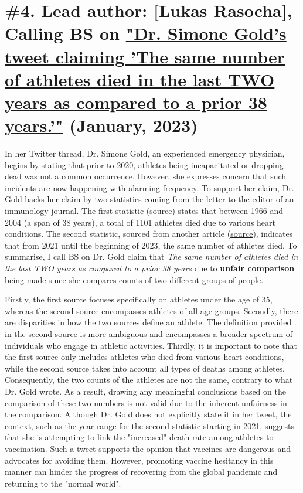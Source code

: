 \documentclass[fleqn,12pt]{article}
\begin{document}
\section{\#4. Lead author: [Lukas Rasocha], Calling BS on \href{https://twitter.com/drsimonegold/status/1610361145294000131?s=20}{"Dr. Simone Gold's tweet claiming 'The same number of athletes died in the last TWO years as 
compared to a prior 38 years.'"} (January, 2023)}
In her Twitter thread, Dr. Simone Gold, an experienced emergency physician, begins by stating that prior to 2020, athletes being incapacitated or dropping dead was not a common occurrence. 
However, she expresses concern that such incidents are now happening with alarming frequency. To support her claim, Dr. Gold backs her claim by two statistics coming from the \href{https://www.ncbi.nlm.nih.gov/pmc/articles/PMC9877705/}{letter} 
to the editor of an immunology journal. The first statistic (\href{https://academic.oup.com/eurjpc/article/13/6/859/5932831}{source}) states that between 1966 and 2004 (a span of 38 years), a total of 1101 athletes died due to various heart conditions. 
The second statistic, sourced from another article (\href{https://goodsciencing.com/covid/athletes-suffer-cardiac-arrest-die-after-covid-shot/}{source}), indicates that from 2021 until the beginning of 2023, the same number of athletes died. 
To summarise, I call BS on Dr. Gold claim that \textit{The same number of athletes died in the last TWO years as compared to a prior 38 years} due to \textbf{unfair comparison} being made since she compares counts of two different 
groups of people.

Firstly, the first source focuses specifically on athletes under the age of 35, whereas the second source encompasses athletes of all age groups. 
Secondly, there are disparities in how the two sources define an athlete. The definition provided in the second source is more ambiguous and encompasses a 
broader spectrum of individuals who engage in athletic activities. Thirdly, it is important to note that the first source only includes athletes who died from various heart conditions, while the second source takes into account all types of deaths among athletes. 
Consequently, the two counts of the athletes are not the same, contrary to what Dr. Gold wrote.
As a result, drawing any meaningful conclusions based on the comparison of these two numbers is not valid due to the inherent unfairness
in the comparison. Although Dr. Gold does not explicitly state it in her tweet, the context, such as the year range for the second statistic starting in 2021, 
suggests that she is attempting to link the "increased" death rate among athletes to vaccination.
Such a tweet supports the opinion that vaccines are dangerous and advocates for avoiding them. 
However, promoting vaccine hesitancy in this manner can hinder the progress of recovering from the global pandemic and returning to the "normal world".
\newpage

\end{document}
